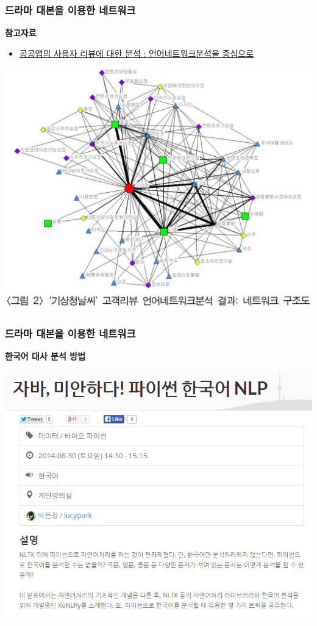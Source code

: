 \documentclass{beamer}
\begin{document}
\begin{frame}[fragile]
\frametitle{드라마 대본을 이용한 네트워크}
\textbf{참고자료}
\begin{itemize}
\item \href{http://www.kipa.re.kr/public/institute/institute_view.jsp?c=&pagenum=4&seqno=933&boardid=40&typeID=50&tableName=TB_TEST02}{공공앱의 사용자 리뷰에 대한 분석 : 언어네트워크분석을 중심으로}
\end{itemize}
\begin{center}
\includegraphics[scale=0.3]{weather.jpg}
\end{center}
\end{frame}


\begin{frame}
\frametitle{드라마 대본을 이용한 네트워크}
\textbf{한국어 대사 분석 방법}
\begin{center}
\includegraphics[scale=0.6]{nlp.png}
\end{center}
\end{frame}
\end{document}
